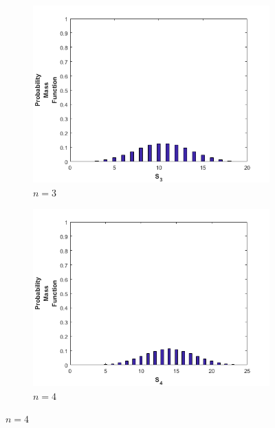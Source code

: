 \documentclass[11pt]{article}
\theoremstyle{definition}
\theoremstyle{lemma}
\theoremstyle{remark}
\begin{document}
\begin{figure}[h!]
		\begin{subfigure}[h!]{0.48\textwidth}
			\includegraphics[width=\textwidth]{./Images/7/3.png}
			\caption{ $n=3$ }
		\end{subfigure}
		\quad
		\begin{subfigure}[h!]{0.48\textwidth}
			\includegraphics[width=\textwidth]{./Images/7/4.png}
			\caption{ $n=4$ }
		\end{subfigure}
	

\end{figure}
\end{document}
